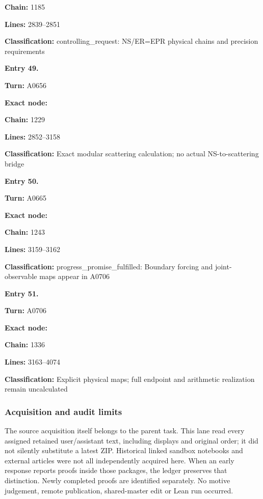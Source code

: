 \textbf{Chain:} 1185

\textbf{Lines:} 2839--2851

\textbf{Classification:} controlling\_request: NS/ER=EPR physical chains
and precision requirements


\textbf{Entry 49.}

\textbf{Turn:} A0656

\textbf{Exact node:} \protect{}

\textbf{Chain:} 1229

\textbf{Lines:} 2852--3158

\textbf{Classification:}
\protect{} Exact modular
scattering calculation; no actual NS-to-scattering bridge


\textbf{Entry 50.}

\textbf{Turn:} A0665

\textbf{Exact node:} \protect{}

\textbf{Chain:} 1243

\textbf{Lines:} 3159--3162

\textbf{Classification:} progress\_promise\_fulfilled: Boundary forcing
and joint-observable maps appear in A0706


\textbf{Entry 51.}

\textbf{Turn:} A0706

\textbf{Exact node:} \protect{}

\textbf{Chain:} 1336

\textbf{Lines:} 3163--4074

\textbf{Classification:}
\protect{} Explicit
physical maps; full endpoint and arithmetic realization remain
uncalculated

\subsubsection{Acquisition and audit
limits}\label{acquisition-and-audit-limits}

The source acquisition itself belongs to the parent task. This lane read
every assigned retained user/assistant text, including displays and
original order; it did not silently substitute a latest ZIP. Historical
linked sandbox notebooks and external articles were not all
independently acquired here. When an early response reports proofs
inside those packages, the ledger preserves that distinction. Newly
completed proofs are identified separately. No motive judgement, remote
publication, shared-master edit or Lean run occurred.

